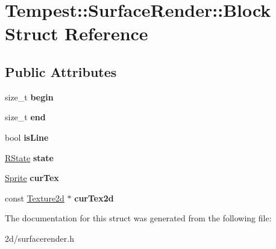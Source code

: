 \hypertarget{struct_tempest_1_1_surface_render_1_1_block}{\section{Tempest\+:\+:Surface\+Render\+:\+:Block Struct Reference}
\label{struct_tempest_1_1_surface_render_1_1_block}
}
\subsection*{Public Attributes}
\begin{DoxyCompactItemize}
\item 
\hypertarget{struct_tempest_1_1_surface_render_1_1_block_ad3ebcca0dc3633af29988351ccacf268}{size\+\_\+t {\bfseries begin}}\label{struct_tempest_1_1_surface_render_1_1_block_ad3ebcca0dc3633af29988351ccacf268}

\item 
\hypertarget{struct_tempest_1_1_surface_render_1_1_block_a228ea36d94d14a684046dfc99aeb6a59}{size\+\_\+t {\bfseries end}}\label{struct_tempest_1_1_surface_render_1_1_block_a228ea36d94d14a684046dfc99aeb6a59}

\item 
\hypertarget{struct_tempest_1_1_surface_render_1_1_block_a90d28043f1cd6bd8ea36e423ae4f23f6}{bool {\bfseries is\+Line}}\label{struct_tempest_1_1_surface_render_1_1_block_a90d28043f1cd6bd8ea36e423ae4f23f6}

\item 
\hypertarget{struct_tempest_1_1_surface_render_1_1_block_a5d925fc98c572112c82fd2291186130f}{\hyperlink{struct_tempest_1_1_surface_render_1_1_r_state}{R\+State} {\bfseries state}}\label{struct_tempest_1_1_surface_render_1_1_block_a5d925fc98c572112c82fd2291186130f}

\item 
\hypertarget{struct_tempest_1_1_surface_render_1_1_block_a22b5740d8d686c9d4de4f5ad61799c1c}{\hyperlink{class_tempest_1_1_sprite}{Sprite} {\bfseries cur\+Tex}}\label{struct_tempest_1_1_surface_render_1_1_block_a22b5740d8d686c9d4de4f5ad61799c1c}

\item 
\hypertarget{struct_tempest_1_1_surface_render_1_1_block_a0ea29ff6ead42aba59d3e10e3e47ac4d}{const \hyperlink{class_tempest_1_1_texture2d}{Texture2d} $\ast$ {\bfseries cur\+Tex2d}}\label{struct_tempest_1_1_surface_render_1_1_block_a0ea29ff6ead42aba59d3e10e3e47ac4d}

\end{DoxyCompactItemize}


The documentation for this struct was generated from the following file\+:\begin{DoxyCompactItemize}
\item 
2d/surfacerender.\+h\end{DoxyCompactItemize}
